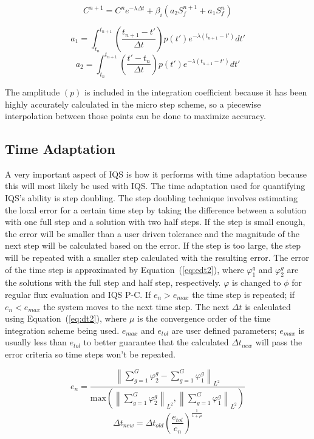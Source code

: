 \documentclass[12pt]{scrartcl}
\newcommand{\norm}[1]{\left\lVert#1\right\rVert_{L^2}}
\newcommand{\eqt}[1]{Equation~(\ref{#1})}                     %
\newcommand{\be}{\begin{equation}}
\newcommand{\ee}{\end{equation}}
\begin{document}
\be
C^{n+1} = C^n e^{-\lambda \Delta t} 
+ \beta_i \left(a_2 S_f^{n+1} + a_1 S_f^{n}\right)
\label{eq:c_dis}
\ee

\be
a_1 = \int_{t_n}^{t_{n+1}}\left(\frac{t_{n+1}-t'}{\Delta t}\right)p(t')e^{-\lambda(t_{n+1}-t')}dt'
\label{eq:a1}
\ee
\be
a_2 = \int_{t_n}^{t_{n+1}}\left(\frac{t'-t_n}{\Delta t}\right)p(t')e^{-\lambda(t_{n+1}-t')}dt'
\label{eq:a2}
\ee

The amplitude $(p)$ is included in the integration coefficient because it has been highly accurately calculated in the micro step scheme, so a piecewise interpolation between those points can be done to maximize accuracy.  


\subsection{Time Adaptation}
\label{sect:dt2}

A very important aspect of IQS is how it performs with time adaptation because this will most likely be used with IQS.  The time adaptation used for quantifying IQS's ability is step doubling.  The step doubling technique involves estimating the local error for a certain time step by taking the difference between a solution with one full step and a solution with two half steps.  If the step is small enough, the error will be smaller than a user driven tolerance and the magnitude of the next step will be calculated based on the error.  If the step is too large, the step will be repeated with a smaller step calculated with the resulting error.  The error of the time step is approximated by \eqt{eq:edt2}, where $\varphi^g_1$ and $\varphi^g_2$ are the solutions with the full step and half step, respectively.  $\varphi$ is changed to $\phi$ for regular flux evaluation and IQS P-C.  If $e_n > e_{max}$ the time step is repeated; if $e_n < e_{max}$ the system moves to the next time step.  The next $\Delta t$ is calculated using \eqt{eq:dt2}, where $\mu$ is the convergence order of the time integration scheme being used.  $e_{max}$ and $e_{tol}$ are user defined parameters; $e_{max}$ is usually less than $e_{tol}$ to better guarantee that the calculated $\Delta t_{new}$ will pass the error criteria so time steps won't be repeated.

\be
e_n = \frac{\norm{\sum_{g=1}^G\varphi^g_2 - \sum_{g=1}^G\varphi^g_1}}{\text{max}\left(\norm{\sum_{g=1}^G\varphi^g_2},\norm{\sum_{g=1}^G\varphi^g_1}\right)}
\label{eq:edt2}
\ee
\be
\Delta t_{new} = \Delta t_{old} \left(\frac{e_{tol}}{e_n}\right)^{\frac{1}{1+\mu}}
\label{eq:dt2}
\ee
\end{document}
